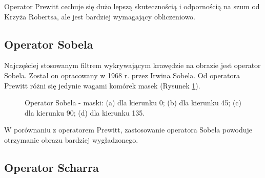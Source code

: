 \documentclass[a4paper,twocolumn,12pt]{article}
\begin{document}
Operator Prewitt cechuje się dużo lepszą skutecznością i odpornością na szum od Krzyża Robertsa, ale jest bardziej wymagający obliczeniowo.


\subsection{Operator Sobela}

Najczęściej stosowanym filtrem wykrywającym krawędzie na obrazie jest operator Sobela.
Został on opracowany w 1968 r. przez Irwina Sobela.
Od operatora Prewitt różni się jedynie wagami komórek masek (Rysunek \ref{fig:sobel_matrices}).

\begin{figure}[!ht]
 \begin{center}
 \end{center}
 \caption{
  Operator Sobela - maski:
  (a) dla kierunku 0\textdegree;
  (b) dla kierunku 45\textdegree;
  (c) dla kierunku 90\textdegree;
  (d) dla kierunku 135\textdegree.
 }
 \label{fig:sobel_matrices}
\end{figure}

W porównaniu z operatorem Prewitt, zastosowanie operatora Sobela powoduje otrzymanie obrazu bardziej wygładzonego.


\subsection{Operator Scharra}
\end{document}

